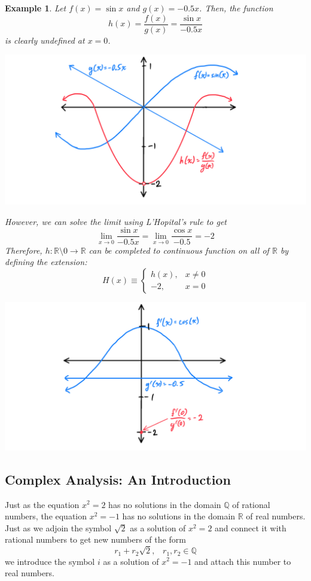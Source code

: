 \documentclass{article}
\newtheorem{example}{Example}[section]
\theoremstyle{remark}
\theoremstyle{definition}
\begin{document}
\begin{example}
Let $f(x) = \sin{x}$ and $g(x) = -0.5x$. Then, the function 
\[h(x) = \frac{f(x)}{g(x)} = \frac{\sin{x}}{-0.5x}\]
is clearly undefined at $x = 0$. 
\begin{center}
    \includegraphics[scale=0.3]{img/LHopital_Example_1.PNG}
\end{center}
However, we can solve the limit using L'Hopital's rule to get
\[\lim_{x \rightarrow 0} \frac{\sin{x}}{-0.5x} = \lim_{x \rightarrow 0} \frac{\cos{x}}{-0.5} = -2\]
Therefore, $h: \mathbb{R} \setminus 0 \longrightarrow \mathbb{R}$ can be completed to continuous function on all of $\mathbb{R}$ by defining the extension: 
\[H(x) \equiv \begin{cases}
h(x), & x \neq 0 \\
-2, & x = 0
\end{cases}\]
\begin{center}
    \includegraphics[scale=0.3]{img/LHopital_Example_2.PNG}
\end{center}
\end{example}

\subsection{Complex Analysis: An Introduction}
Just as the equation $x^2 = 2$ has no solutions in the domain $\mathbb{Q}$ of rational numbers, the equation $x^2 = -1$ has no solutions in the domain $\mathbb{R}$ of real numbers. Just as we adjoin the symbol $\sqrt{2}$ as a solution of $x^2 = 2$ and connect it with rational numbers to get new numbers of the form 
\[r_1 + r_2 \sqrt{2}, \;\;\; r_1, r_2 \in \mathbb{Q}\]
we introduce the symbol $i$ as a solution of $x^2 = -1$ and attach this number to real numbers. 
\end{document}
